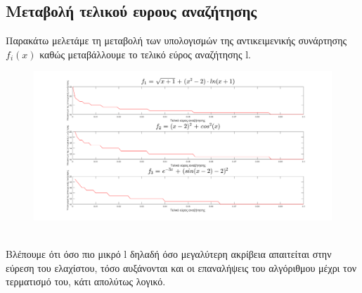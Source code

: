 \documentclass{article}
\begin{document}
\subsection*{Μεταβολή τελικού ευρους αναζήτησης}
Παρακάτω μελετάμε τη μεταβολή των υπολογισμών της αντικειμενικής συνάρτησης $f_i(x)$
καθώς μεταβάλλουμε το τελικό εύρος αναζήτησης l.
\begin{figure}[h!]	
     \centering
     \advance\leftskip-4.75cm 
  \includegraphics[width=220mm,scale=2]{thema2a.png}
\end{figure} \\
Βλέπουμε ότι όσο πιο μικρό l δηλαδή όσο μεγαλύτερη ακρίβεια απαιτείται στην εύρεση του
ελαχίστου, τόσο αυξάνονται και οι επαναλήψεις του αλγόριθμου μέχρι τον τερματισμό του, κάτι
απολύτως λογικό.
 \clearpage
\end{document}
